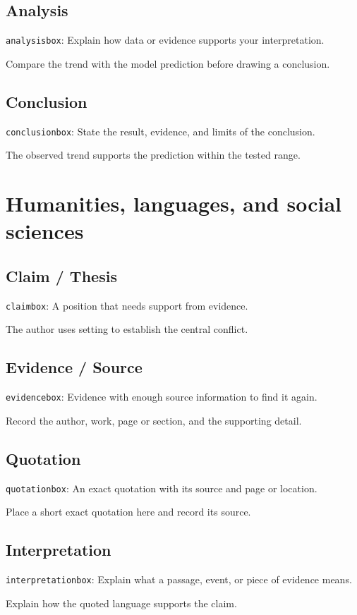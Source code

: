 \documentclass[11pt]{article}
\begin{document}
\subsection{Analysis}
{\small\texttt{analysisbox}: Explain how data or evidence supports your interpretation.}
\begin{analysisbox}
Compare the trend with the model prediction before drawing a conclusion.
\end{analysisbox}
\subsection{Conclusion}
{\small\texttt{conclusionbox}: State the result, evidence, and limits of the conclusion.}
\begin{conclusionbox}
The observed trend supports the prediction within the tested range.
\end{conclusionbox}

\clearpage
\section{Humanities, languages, and social sciences}
\subsection{Claim / Thesis}
{\small\texttt{claimbox}: A position that needs support from evidence.}
\begin{claimbox}
The author uses setting to establish the central conflict.
\end{claimbox}
\subsection{Evidence / Source}
{\small\texttt{evidencebox}: Evidence with enough source information to find it again.}
\begin{evidencebox}
Record the author, work, page or section, and the supporting detail.
\end{evidencebox}
\subsection{Quotation}
{\small\texttt{quotationbox}: An exact quotation with its source and page or location.}
\begin{quotationbox}
Place a short exact quotation here and record its source.
\end{quotationbox}
\subsection{Interpretation}
{\small\texttt{interpretationbox}: Explain what a passage, event, or piece of evidence means.}
\begin{interpretationbox}
Explain how the quoted language supports the claim.
\end{interpretationbox}
\end{document}
